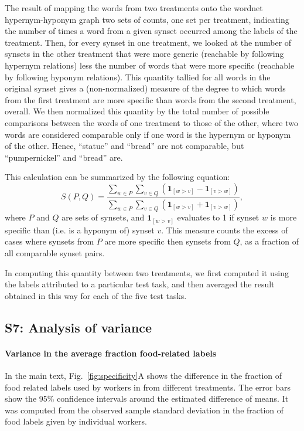 \documentclass[12pt]{article}
\begin{document}
The result of mapping the words from two treatments onto the wordnet 
hypernym-hyponym graph two sets of counts, one set per treatment, 
indicating the number of times a word from a given synset occurred among the
labels of the treatment.  Then, for every synset in one treatment, we looked
at the number of synsets in the other treatment that were more generic
(reachable by following hypernym relations) less the number of words that
were more specific (reachable by following hyponym relations).  This quantity
tallied for all words in the original synset gives a (non-normalized) measure
of the degree to which words from the first treatment are more specific
than words from the second treatment, overall.  We then normalized this 
quantity by the total number of possible comparisons between the words of
one treatment to those of the other, where two words are considered comparable
only if one word is the hypernym or hyponym of the other.  Hence, ``statue'' 
and ``bread'' are not comparable, but ``pumpernickel'' and ``bread'' are.

This calculation can be summarized by the following equation:
\begin{equation}
	S(P,Q) = \frac{
		\sum_{w\in P}\sum_{v\in Q} \left(
			\mathbf{1}_{[w>v]} - \mathbf{1}_{[v>w]} \right)
	}{
		\sum_{w\in P}\sum_{v\in Q} \left(
			\mathbf{1}_{[w>v]} + \mathbf{1}_{[v>w]} \right)
	},
\end{equation}
where $P$ and $Q$ are sets of synsets, and $\mathbf{1}_{[w>v]}$ evaluates
to 1 if synset $w$ is more specific than (i.e. is a hyponym of) synset $v$.
This measure counts the excess of cases where synsets from $P$ are more
specific then synsets from $Q$, as a fraction of all comparable synset pairs. 

In computing this quantity between two treatments, we first computed it 
using the labels attributed to a particular test task, and then
averaged the result obtained in this way for each of the five test tasks.

\subsection*{S7: Analysis of variance}
	\paragraph{Variance in the average fraction food-related labels}
	In the main text, Fig.~\ref{fig:specificity}A shows the difference in 
	the fraction of food related labels used by workers in from different 
	treatments.  The error bars show the 95\% confidence intervals around 
	the estimated difference of means.  It was computed from the
	observed sample standard deviation in the fraction of food labels given
	by individual workers.
\end{document}
